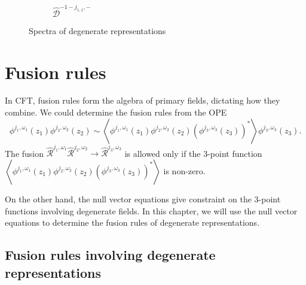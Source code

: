\documentclass[10pt,a4paper]{article}
\numberwithin{equation}{section}
\newcommand{\vev}[1]{\left\langle #1 \right\rangle}
\begin{document}
\begin{figure}[htbp]
\begin{subfigure}[b]{0.48\textwidth}
        \caption{$\widehat{\mathcal{D}}^{-1-j_{1,1}, -}$}
        \label{fig:E 1_-1}
    \end{subfigure}

    \caption{Spectra of degenerate representations}
    \label{fig:degrep}
\end{figure}

\section{Fusion rules}
In CFT, fusion rules form the algebra of primary fields, dictating how they combine. We could determine the fusion rules from the 
OPE 
\begin{equation}
    \phi^{j_{1},\omega_{1}}(z_{1}) \phi^{j_{2},\omega_{2}}(z_{2}) \sim 
    \vev{\phi^{j_{1},\omega_{1}}(z_{1}) \phi^{j_{2},\omega_{2}}(z_{2}) \left(\phi^{j_{3},\omega_{3}}(z_{3}) \right)^{*}} \phi^{j_{3},\omega_{3}}(z_{3}).
\end{equation}
The fusion $\widehat{\mathcal{R}}^{j_{1},\omega_{1}} \widehat{\mathcal{R}}^{j_{2},\omega_{2}} \rightarrow \widehat{\mathcal{R}}^{j_{3},\omega_{3}}$
is allowed only if the 3-point function 
$\vev{\phi^{j_{1},\omega_{1}}(z_{1}) \phi^{j_{2},\omega_{2}}(z_{2}) \left(\phi^{j_{3},\omega_{3}}(z_{3}) \right)^{*}}$ is non-zero.

On the other hand, the null vector equations give constraint on the 3-point functions involving degenerate fields. In this chapter, we 
will use the null vector equations to determine the fusion rules of degenerate representations.

\subsection{Fusion rules involving degenerate representations}
\end{document}
